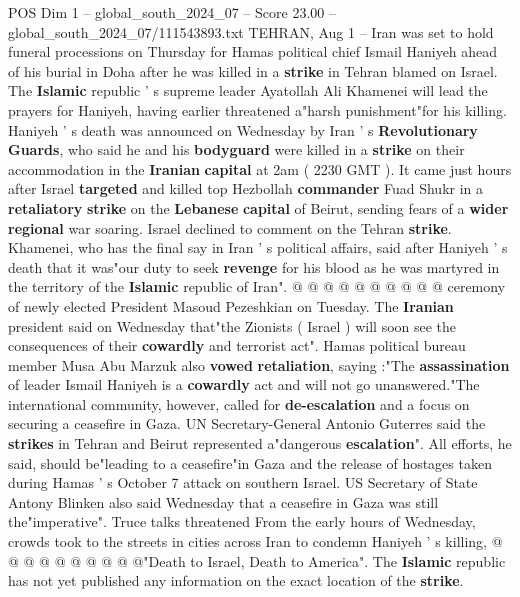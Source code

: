 \begin{textsample}{POS Dim 1 – global\_south\_2024\_07 – Score 23.00 – global\_south\_2024\_07/111543893.txt}  \label{ex:f1_pos_068}
TEHRAN, Aug 1 -- Iran was set to hold funeral processions on Thursday for Hamas political chief Ismail Haniyeh ahead of his burial in Doha after he was killed in a \textbf{strike} in Tehran blamed on Israel.
The \textbf{Islamic} republic ' s supreme leader Ayatollah Ali Khamenei will lead the prayers for Haniyeh, having earlier threatened a"harsh punishment"for his killing.
Haniyeh ' s death was announced on Wednesday by Iran ' s \textbf{Revolutionary} \textbf{Guards}, who said he and his \textbf{bodyguard} were killed in a \textbf{strike} on their accommodation in the \textbf{Iranian} \textbf{capital} at 2am ( 2230 GMT ).
It came just hours after Israel \textbf{targeted} and killed top Hezbollah \textbf{commander} Fuad Shukr in a \textbf{retaliatory} \textbf{strike} on the \textbf{Lebanese} \textbf{capital} of Beirut, sending fears of a \textbf{wider} \textbf{regional} war soaring.
Israel declined to comment on the Tehran \textbf{strike}.
Khamenei, who has the final say in Iran ' s political affairs, said after Haniyeh ' s death that it was"our duty to seek \textbf{revenge} for his blood as he was martyred in the territory of the \textbf{Islamic} republic of Iran". @ @ @ @ @ @ @ @ @ @ ceremony of newly elected President Masoud Pezeshkian on Tuesday.
The \textbf{Iranian} president said on Wednesday that"the Zionists ( Israel ) will soon see the consequences of their \textbf{cowardly} and terrorist act".
Hamas political bureau member Musa Abu Marzuk also \textbf{vowed} \textbf{retaliation}, saying :"The \textbf{assassination} of leader Ismail Haniyeh is a \textbf{cowardly} act and will not go unanswered."The international community, however, called for \textbf{de-escalation} and a focus on securing a ceasefire in Gaza.
UN Secretary-General Antonio Guterres said the \textbf{strikes} in Tehran and Beirut represented a"dangerous \textbf{escalation}".
All efforts, he said, should be"leading to a ceasefire"in Gaza and the release of hostages taken during Hamas ' s October 7 attack on southern Israel.
US Secretary of State Antony Blinken also said Wednesday that a ceasefire in Gaza was still the"imperative".
Truce talks threatened From the early hours of Wednesday, crowds took to the streets in cities across Iran to condemn Haniyeh ' s killing, @ @ @ @ @ @ @ @ @ @"Death to Israel, Death to America".
The \textbf{Islamic} republic has not yet published any information on the exact location of the \textbf{strike}.

\end{textsample}
